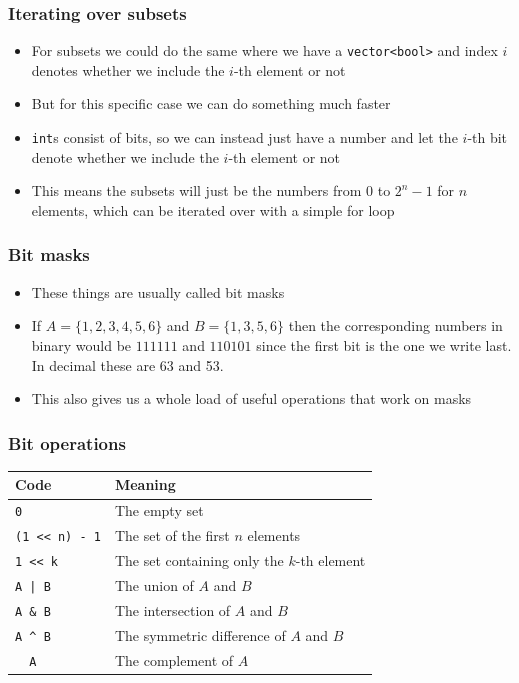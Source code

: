 \documentclass{beamer}
\begin{document}
\begin{frame}[plain]
	\frametitle{Iterating over subsets}
	\begin{itemize}
		 \item For subsets we could do the same where we have a \texttt{vector<bool>} and index $i$ denotes whether we include the $i$-th element or not
		 \item But for this specific case we can do something much faster
		 \item \texttt{int}s consist of bits, so we can instead just have a number and let the $i$-th bit denote whether we include the $i$-th element or not
		 \item This means the subsets will just be the numbers from $0$ to $2^n - 1$ for $n$ elements, which can be iterated over with a simple for loop
	\end{itemize}
\end{frame}

\begin{frame}[plain]
	\frametitle{Bit masks}
	\begin{itemize}
		 \item These things are usually called bit masks
		 \item If $A = \{1, 2, 3, 4, 5, 6\}$ and $B = \{1, 3, 5, 6\}$ then the corresponding numbers in binary would be $111111$ and $110101$ since the first bit is the one we write last. In decimal these are 63 and 53.
		 \item This also gives us a whole load of useful operations that work on masks
	\end{itemize}
\end{frame}

\begin{frame}[plain]
	\frametitle{Bit operations}
	\begin{tabular}{|l|l|}
	\hline
	Code & Meaning \\
	\hline
	\texttt{0} & The empty set \\
	\texttt{(1 <{}< n) - 1} & The set of the first $n$ elements \\
	\texttt{1 <{}< k} & The set containing only the $k$-th element \\
	\texttt{A | B} & The union of $A$ and $B$ \\
	\texttt{A \& B} & The intersection of $A$ and $B$ \\
	\texttt{A \string^ B} & The symmetric difference of $A$ and $B$ \\
	\texttt{\string~ A} & The complement of $A$ \\
	\hline
	\end{tabular}
\end{frame}
\end{document}
